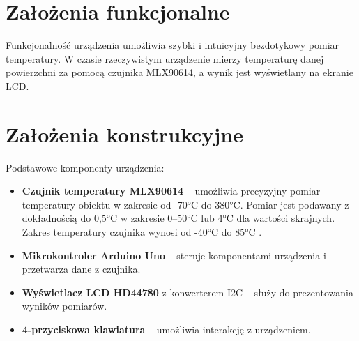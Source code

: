 
\section{Założenia funkcjonalne}

Funkcjonalność urządzenia umożliwia szybki i intuicyjny bezdotykowy pomiar temperatury. W czasie rzeczywistym urządzenie mierzy temperaturę danej powierzchni za pomocą czujnika MLX90614, a wynik jest wyświetlany na ekranie LCD. 

\section{Założenia konstrukcyjne}

Podstawowe komponenty urządzenia:
\begin{itemize}
    \item \textbf{Czujnik temperatury MLX90614} – umożliwia precyzyjny pomiar temperatury obiektu w zakresie od -70°C do 380°C. Pomiar jest podawany z dokładnością do 0,5°C w zakresie 0–50°C lub 4°C dla wartości skrajnych. Zakres temperatury czujnika wynosi od -40°C do 85°C \cite{4}.
    \item \textbf{Mikrokontroler Arduino Uno} – steruje komponentami urządzenia i przetwarza dane z czujnika.
    \item \textbf{Wyświetlacz LCD HD44780} z konwerterem I2C – służy do prezentowania wyników pomiarów.
    \item \textbf{4-przyciskowa klawiatura} – umożliwia interakcję z urządzeniem.
    
   
\end{itemize}

